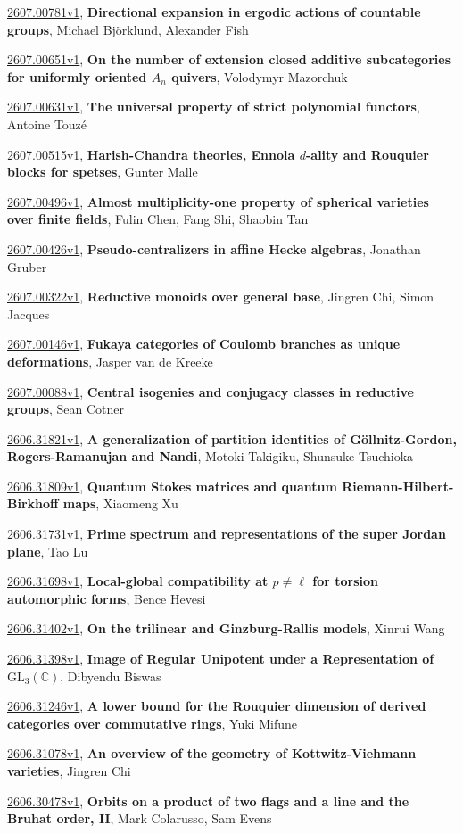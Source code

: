 \documentclass[9pt, a4paper]{article}
\theoremstyle{plain}
\theoremstyle{definition}
\theoremstyle{remark}
\newcommand{\arxiv}[3]{\href{https://arxiv.org/abs/#1}{#1}, \textbf{\textcolor{arxivblue}{#2}}, #3}
\begin{document}
\arxiv{2607.00781v1}{Directional expansion in ergodic actions of countable groups}{Michael Björklund, Alexander Fish}

\arxiv{2607.00651v1}{On the number of extension closed additive subcategories for uniformly oriented $A_n$ quivers}{Volodymyr Mazorchuk}

\arxiv{2607.00631v1}{The universal property of strict polynomial functors}{Antoine Touzé}

\arxiv{2607.00515v1}{Harish-Chandra theories, Ennola $d$-ality and Rouquier blocks for spetses}{Gunter Malle}

\arxiv{2607.00496v1}{Almost multiplicity-one property of spherical varieties over finite fields}{Fulin Chen, Fang Shi, Shaobin Tan}

\arxiv{2607.00426v1}{Pseudo-centralizers in affine Hecke algebras}{Jonathan Gruber}

\arxiv{2607.00322v1}{Reductive monoids over general base}{Jingren Chi, Simon Jacques}

\arxiv{2607.00146v1}{Fukaya categories of Coulomb branches as unique deformations}{Jasper van de Kreeke}

\arxiv{2607.00088v1}{Central isogenies and conjugacy classes in reductive groups}{Sean Cotner}

\arxiv{2606.31821v1}{A generalization of partition identities of Göllnitz-Gordon, Rogers-Ramanujan and Nandi}{Motoki Takigiku, Shunsuke Tsuchioka}

\arxiv{2606.31809v1}{Quantum Stokes matrices and quantum Riemann-Hilbert-Birkhoff maps}{Xiaomeng Xu}

\arxiv{2606.31731v1}{Prime spectrum and representations of the super Jordan plane}{Tao Lu}

\arxiv{2606.31698v1}{Local-global compatibility at $p\neq\ell$ for torsion automorphic forms}{Bence Hevesi}

\arxiv{2606.31402v1}{On the trilinear and Ginzburg-Rallis models}{Xinrui Wang}

\arxiv{2606.31398v1}{Image of Regular Unipotent under a Representation of $\mathrm{GL}_3(\mathbb{C})$}{Dibyendu Biswas}

\arxiv{2606.31246v1}{A lower bound for the Rouquier dimension of derived categories over commutative rings}{Yuki Mifune}

\arxiv{2606.31078v1}{An overview of the geometry of Kottwitz-Viehmann varieties}{Jingren Chi}

\arxiv{2606.30478v1}{Orbits on a product of two flags and a line and the Bruhat order, II}{Mark Colarusso, Sam Evens}
\end{document}
